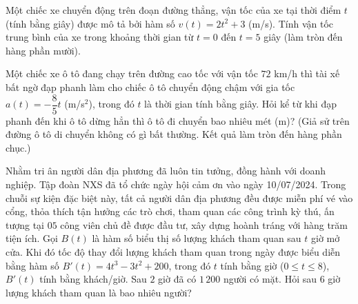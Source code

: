 \begin{bt}%
	Một chiếc xe chuyển động trên đoạn đường thẳng, vận tốc của xe  tại thời điểm $t$ (tính bằng giây) được mô tả bởi hàm số $v(t)=2t^2+3$ (m/s). Tính vận tốc trung bình của xe trong khoảng thời gian từ $t=0$ đến $t=5$ giây (làm tròn đến hàng phần mười).
\end{bt}

\begin{bt}%
	Một chiếc xe ô tô đang chạy trên đường cao tốc với vận tốc $72$ km/h thì tài xế bất  ngờ đạp phanh làm cho chiếc ô tô chuyển động chậm với gia tốc $a(t)=-\dfrac{8}{5}t$ (m/s$^2$), trong đó $t$ là thời gian tính bằng giây. Hỏi kể từ khi đạp phanh đến khi ô tô dừng hẳn thì ô tô đi chuyển bao nhiêu mét (m)? (Giả sử trên đường ô tô di chuyển không có gì bất thường. Kết quả làm tròn đến hàng phần chục.)
\end{bt}

\begin{bt}%
	Nhằm tri ân người dân địa phương đã luôn tin tưởng, đồng hành với doanh nghiệp. Tập đoàn NXS đã tổ chức ngày hội cảm ơn vào ngày 10/07/2024. Trong chuỗi sự kiện đặc biệt này, tất cả người dân địa phương đều được miễn phí vé vào cổng, thỏa  thích tận hưởng các trò chơi, tham quan các công trình kỳ thú, ấn tượng tại $05$ công viên chủ đề được đầu tư, xây dựng hoành tráng với hàng trăm tiện ích. Gọi $B(t)$ là hàm số biểu thị số lượng khách tham quan sau $t$ giờ mở cửa. Khi đó tốc độ thay đổi lượng khách tham quan trong ngày được biểu diễn bằng hàm số $B'(t)=4t^3-3t^2+200$, trong đó $t$ tính bằng giờ ($0\le t\le 8$), $B'(t)$ tính bằng khách/giờ. Sau $2$ giờ đã có $1\,200$ người có mặt. Hỏi sau $6$ giờ lượng khách tham quan là bao nhiêu người?
\end{bt}

